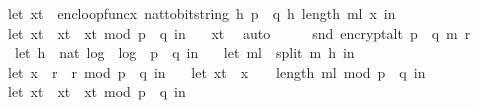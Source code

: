 \begin{isabellebody}
\ \ let\ x{\isacharunderscore}{\kern0pt}t\ {\isacharequal}{\kern0pt}\ enc{\isacharunderscore}{\kern0pt}loop{\isacharunderscore}{\kern0pt}func{\isacharunderscore}{\kern0pt}x\ {\isacharparenleft}{\kern0pt}nat{\isacharunderscore}{\kern0pt}to{\isacharunderscore}{\kern0pt}bitstring\ h{\isacharcomma}{\kern0pt}\ p\ {\isacharasterisk}{\kern0pt}\ q{\isacharcomma}{\kern0pt}\ h{\isacharcomma}{\kern0pt}\ length\ m{\isacharunderscore}{\kern0pt}l{\isacharparenright}{\kern0pt}\ x{\isacharunderscore}{\kern0pt}{}\ in\ \isanewline
\ \ let\ x{\isacharunderscore}{\kern0pt}t{\isacharprime}{\kern0pt}\ {\isacharequal}{\kern0pt}\ x{\isacharunderscore}{\kern0pt}t\ {\isacharasterisk}{\kern0pt}\ x{\isacharunderscore}{\kern0pt}t\ mod\ {\isacharparenleft}{\kern0pt}p\ {\isacharasterisk}{\kern0pt}\ q{\isacharparenright}{\kern0pt}\ in\ \isanewline
\ \ x{\isacharunderscore}{\kern0pt}t{\isacharprime}{\kern0pt}{\isacharparenright}{\kern0pt}{\isachardoublequoteclose}\ \isamarkupfalse%
\ auto\isanewline
\isanewline
\ \ \isamarkupfalse%
\ \isamarkupfalse%
\ {\isachardoublequoteopen}snd\ {\isacharparenleft}{\kern0pt}encrypt{\isacharunderscore}{\kern0pt}alt\ {\isacharparenleft}{\kern0pt}p\ {\isacharasterisk}{\kern0pt}\ q{\isacharparenright}{\kern0pt}\ m\ r{\isacharparenright}{\kern0pt}\ \isanewline
\ \ {\isacharequal}{\kern0pt}\ {\isacharparenleft}{\kern0pt}let\ h\ {\isacharequal}{\kern0pt}\ nat\ {\isasymlfloor}log\ {}\ {\isacharparenleft}{\kern0pt}log\ {}\ {\isacharparenleft}{\kern0pt}p\ {\isacharasterisk}{\kern0pt}\ q{\isacharparenright}{\kern0pt}{\isacharparenright}{\kern0pt}{\isasymrfloor}\ in\ \isanewline
\ \ let\ m{\isacharunderscore}{\kern0pt}l\ {\isacharequal}{\kern0pt}\ split\ m\ h\ in\ \isanewline
\ \ let\ x{\isacharunderscore}{\kern0pt}{}\ {\isacharequal}{\kern0pt}\ {\isacharparenleft}{\kern0pt}r\ {\isacharasterisk}{\kern0pt}\ r{\isacharparenright}{\kern0pt}\ mod\ {\isacharparenleft}{\kern0pt}p\ {\isacharasterisk}{\kern0pt}\ q{\isacharparenright}{\kern0pt}\ in\ \isanewline
\ \ let\ x{\isacharunderscore}{\kern0pt}t\ {\isacharequal}{\kern0pt}\ x{\isacharunderscore}{\kern0pt}{}\ {\isacharcircum}{\kern0pt}\ {\isacharparenleft}{\kern0pt}{}\ {\isacharcircum}{\kern0pt}\ {\isacharparenleft}{\kern0pt}length\ m{\isacharunderscore}{\kern0pt}l{\isacharparenright}{\kern0pt}{\isacharparenright}{\kern0pt}\ mod\ {\isacharparenleft}{\kern0pt}p\ {\isacharasterisk}{\kern0pt}\ q{\isacharparenright}{\kern0pt}\ in\ \isanewline
\ \ let\ x{\isacharunderscore}{\kern0pt}t{\isacharprime}{\kern0pt}\ {\isacharequal}{\kern0pt}\ x{\isacharunderscore}{\kern0pt}t\ {\isacharasterisk}{\kern0pt}\ x{\isacharunderscore}{\kern0pt}t\ mod\ {\isacharparenleft}{\kern0pt}p\ {\isacharasterisk}{\kern0pt}\ q{\isacharparenright}{\kern0pt}\ in\ \isanewline

\end{isabellebody}
